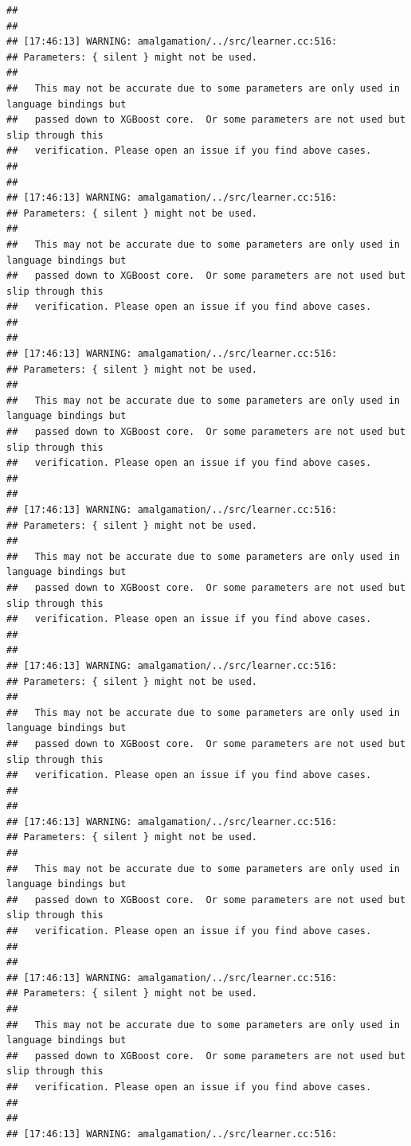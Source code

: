 \documentclass[AMS,STIX2COL]{WileyNJD-v2}\usepackage[]{graphicx}\usepackage[]{color}
\makeatletter
\newenvironment{kframe}{%
 \def\at@end@of@kframe{}%
 \ifinner\ifhmode%
  \def\at@end@of@kframe{\end{minipage}}%
  \begin{minipage}{\columnwidth}%
 \fi\fi%
 \def\FrameCommand##1{\hskip\@totalleftmargin \hskip-\fboxsep
 \colorbox{shadecolor}{##1}\hskip-\fboxsep
     \hskip-\linewidth \hskip-\@totalleftmargin \hskip\columnwidth}%
 \MakeFramed {\advance\hsize-\width
   \@totalleftmargin\z@ \linewidth\hsize
   \@setminipage}}%
 {\par\unskip\endMakeFramed%
 \at@end@of@kframe}
\newenvironment{knitrout}{}{} %
\makeatother
\begin{document}
\begin{knitrout}
\begin{kframe}
\begin{verbatim}
## 
## 
## [17:46:13] WARNING: amalgamation/../src/learner.cc:516: 
## Parameters: { silent } might not be used.
## 
##   This may not be accurate due to some parameters are only used in language bindings but
##   passed down to XGBoost core.  Or some parameters are not used but slip through this
##   verification. Please open an issue if you find above cases.
## 
## 
## [17:46:13] WARNING: amalgamation/../src/learner.cc:516: 
## Parameters: { silent } might not be used.
## 
##   This may not be accurate due to some parameters are only used in language bindings but
##   passed down to XGBoost core.  Or some parameters are not used but slip through this
##   verification. Please open an issue if you find above cases.
## 
## 
## [17:46:13] WARNING: amalgamation/../src/learner.cc:516: 
## Parameters: { silent } might not be used.
## 
##   This may not be accurate due to some parameters are only used in language bindings but
##   passed down to XGBoost core.  Or some parameters are not used but slip through this
##   verification. Please open an issue if you find above cases.
## 
## 
## [17:46:13] WARNING: amalgamation/../src/learner.cc:516: 
## Parameters: { silent } might not be used.
## 
##   This may not be accurate due to some parameters are only used in language bindings but
##   passed down to XGBoost core.  Or some parameters are not used but slip through this
##   verification. Please open an issue if you find above cases.
## 
## 
## [17:46:13] WARNING: amalgamation/../src/learner.cc:516: 
## Parameters: { silent } might not be used.
## 
##   This may not be accurate due to some parameters are only used in language bindings but
##   passed down to XGBoost core.  Or some parameters are not used but slip through this
##   verification. Please open an issue if you find above cases.
## 
## 
## [17:46:13] WARNING: amalgamation/../src/learner.cc:516: 
## Parameters: { silent } might not be used.
## 
##   This may not be accurate due to some parameters are only used in language bindings but
##   passed down to XGBoost core.  Or some parameters are not used but slip through this
##   verification. Please open an issue if you find above cases.
## 
## 
## [17:46:13] WARNING: amalgamation/../src/learner.cc:516: 
## Parameters: { silent } might not be used.
## 
##   This may not be accurate due to some parameters are only used in language bindings but
##   passed down to XGBoost core.  Or some parameters are not used but slip through this
##   verification. Please open an issue if you find above cases.
## 
## 
## [17:46:13] WARNING: amalgamation/../src/learner.cc:516: 

\end{verbatim}
\end{kframe}
\end{knitrout}
\end{document}
